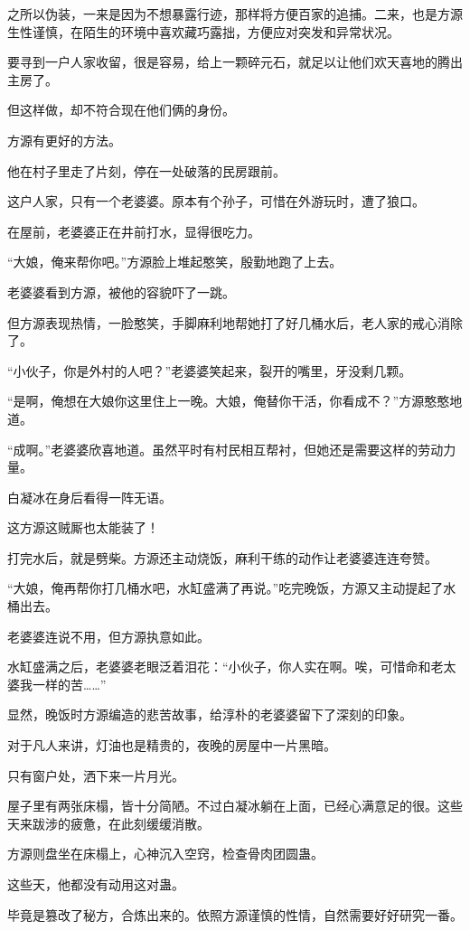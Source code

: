 \begin{this_body}
之所以伪装，一来是因为不想暴露行迹，那样将方便百家的追捕。二来，也是方源生性谨慎，在陌生的环境中喜欢藏巧露拙，方便应对突发和异常状况。

要寻到一户人家收留，很是容易，给上一颗碎元石，就足以让他们欢天喜地的腾出主房了。

但这样做，却不符合现在他们俩的身份。

方源有更好的方法。

他在村子里走了片刻，停在一处破落的民房跟前。

这户人家，只有一个老婆婆。原本有个孙子，可惜在外游玩时，遭了狼口。

在屋前，老婆婆正在井前打水，显得很吃力。

“大娘，俺来帮你吧。”方源脸上堆起憨笑，殷勤地跑了上去。

老婆婆看到方源，被他的容貌吓了一跳。

但方源表现热情，一脸憨笑，手脚麻利地帮她打了好几桶水后，老人家的戒心消除了。

“小伙子，你是外村的人吧？”老婆婆笑起来，裂开的嘴里，牙没剩几颗。

“是啊，俺想在大娘你这里住上一晚。大娘，俺替你干活，你看成不？”方源憨憨地道。

“成啊。”老婆婆欣喜地道。虽然平时有村民相互帮衬，但她还是需要这样的劳动力量。

白凝冰在身后看得一阵无语。

这方源这贼厮也太能装了！

打完水后，就是劈柴。方源还主动烧饭，麻利干练的动作让老婆婆连连夸赞。

“大娘，俺再帮你打几桶水吧，水缸盛满了再说。”吃完晚饭，方源又主动提起了水桶出去。

老婆婆连说不用，但方源执意如此。

水缸盛满之后，老婆婆老眼泛着泪花：“小伙子，你人实在啊。唉，可惜命和老太婆我一样的苦……”

显然，晚饭时方源编造的悲苦故事，给淳朴的老婆婆留下了深刻的印象。

对于凡人来讲，灯油也是精贵的，夜晚的房屋中一片黑暗。

只有窗户处，洒下来一片月光。

屋子里有两张床榻，皆十分简陋。不过白凝冰躺在上面，已经心满意足的很。这些天来跋涉的疲惫，在此刻缓缓消散。

方源则盘坐在床榻上，心神沉入空窍，检查骨肉团圆蛊。

这些天，他都没有动用这对蛊。

毕竟是篡改了秘方，合炼出来的。依照方源谨慎的性情，自然需要好好研究一番。


\end{this_body}
